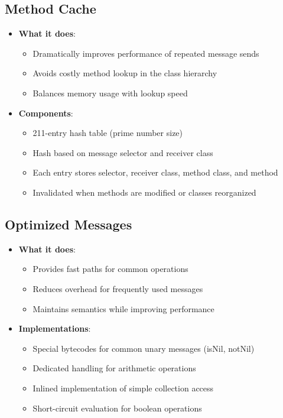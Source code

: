 \documentclass[12pt,a4paper]{report}
\begin{document}
\subsection{Method Cache}
\begin{itemize}
    \item \textbf{What it does}:
    \begin{itemize}
        \item Dramatically improves performance of repeated message sends
        \item Avoids costly method lookup in the class hierarchy
        \item Balances memory usage with lookup speed
    \end{itemize}
    
    \item \textbf{Components}:
    \begin{itemize}
        \item 211-entry hash table (prime number size)
        \item Hash based on message selector and receiver class
        \item Each entry stores selector, receiver class, method class, and method
        \item Invalidated when methods are modified or classes reorganized
    \end{itemize}
\end{itemize}

\subsection{Optimized Messages}
\begin{itemize}
    \item \textbf{What it does}:
    \begin{itemize}
        \item Provides fast paths for common operations
        \item Reduces overhead for frequently used messages
        \item Maintains semantics while improving performance
    \end{itemize}
    
    \item \textbf{Implementations}:
    \begin{itemize}
        \item Special bytecodes for common unary messages (isNil, notNil)
        \item Dedicated handling for arithmetic operations
        \item Inlined implementation of simple collection access
        \item Short-circuit evaluation for boolean operations
    \end{itemize}
\end{itemize}
\end{document}
